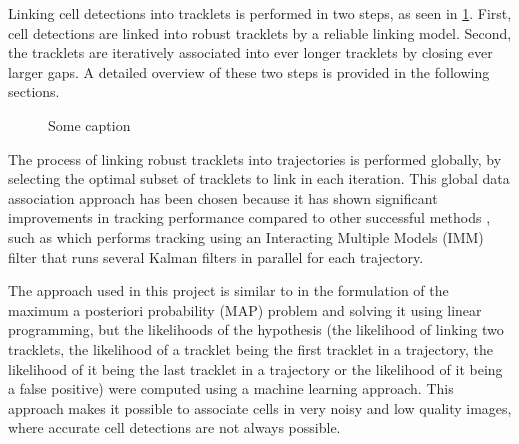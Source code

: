 		Linking cell detections into tracklets is performed in two steps, as seen in \cref{fig:trackingoveriew}. First, cell detections are linked into robust tracklets by a reliable linking model. Second, the tracklets are iteratively  associated into ever longer tracklets by closing ever larger gaps. A detailed overview of these two steps is provided in the following sections.
	
		\begin{figure}[h]
			\centering
			\caption{Some caption}
			\label{fig:trackingoveriew}
		\end{figure}
		
		The process of linking robust tracklets into trajectories is performed globally, by selecting the optimal subset of tracklets to link in each iteration. This global data association approach has been chosen because it has shown significant improvements in tracking performance compared to other successful methods \cite{bise11global}, such as \cite{li08} which performs tracking using an Interacting Multiple Models (IMM) filter that runs several Kalman filters in parallel for each trajectory.
		
		The approach used in this project is similar to \cite{bise11} in the formulation of the maximum a posteriori probability (MAP) problem and solving it using linear programming, but the likelihoods of the hypothesis (the likelihood of linking two tracklets, the likelihood of a tracklet being the first tracklet in a trajectory, the likelihood of it being the last tracklet in a trajectory or the likelihood of it being a false positive) were computed using a machine learning approach. This approach makes it possible to associate cells in very noisy and low quality images, where accurate cell detections are not always possible.
		
